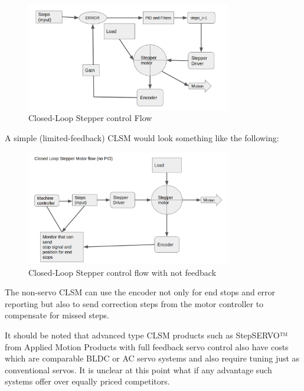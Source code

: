 \documentclass{article}
\begin{document}
\begin{figure}[h!]
  \centering
  \includegraphics[width=0.8\textwidth]{CLSM_flow.png}
  \captionsetup{justification=centering}
  \caption{Closed-Loop Stepper control Flow}
   \label{fig:CLSM}
\end{figure}
\par 
A simple (limited-feedback) CLSM would look something like the following:
\begin{figure}[h!]
  \centering
  \includegraphics[width=0.8\textwidth]{CLSM_noPID.png}
  \captionsetup{justification=centering}
  \caption{Closed-Loop Stepper control flow with not feedback}
   \label{fig:CLSM}
\end{figure}
\par
The non-servo CLSM can use the encoder not only for end stops and error reporting but also to send correction steps from the motor controller to compensate for missed steps. 
\par
It should be noted that advanced type CLSM products such as StepSERVO™ from Applied Motion Products with full feedback servo control also have costs which are  comparable BLDC or AC servo systems and also require tuning just as conventional servos. It is unclear at this point what if any advantage such systems offer over equally priced competitors. 
\end{document}
